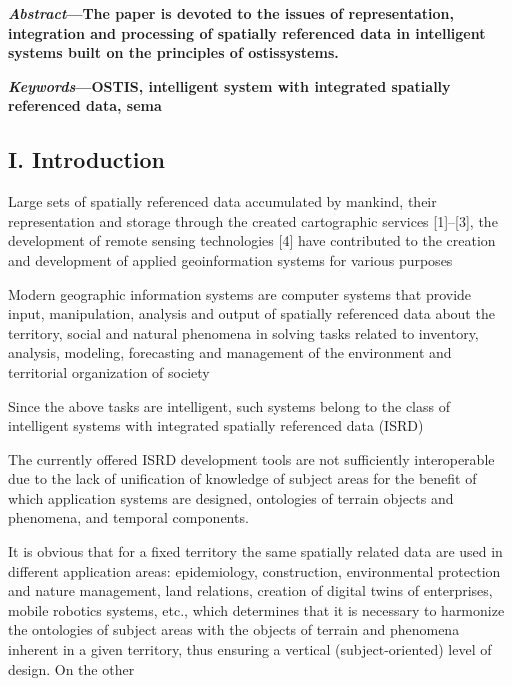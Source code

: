 \documentclass [10pt, letterpaper]{article}
\begin{document}
\begin{multicols}{2}
\textbf{\textit{Abstract}—The paper is devoted to the issues of representation, integration and processing of spatially referenced
data in intelligent systems built on the principles of ostissystems.}\par
\textbf{\textit{Keywords}—OSTIS, intelligent system with integrated spatially referenced data, sema}

    \begin{center}
    \section*{I. Introduction}
\end{center}

\par{Large sets of spatially referenced data accumulated by
mankind, their representation and storage through the
created cartographic services [1]–[3], the development
of remote sensing technologies [4] have contributed to
the creation and development of applied geoinformation
systems for various purposes}\par{Modern geographic information systems are computer
systems that provide input, manipulation, analysis and
output of spatially referenced data about the territory,
social and natural phenomena in solving tasks related to
inventory, analysis, modeling, forecasting and management of the environment and territorial organization of
society}\par{Since the above tasks are intelligent, such systems
belong to the class of intelligent systems with integrated
spatially referenced data (ISRD)}
\par{The currently offered ISRD development tools are not
sufficiently interoperable due to the lack of unification
of knowledge of subject areas for the benefit of which
application systems are designed, ontologies of terrain
objects and phenomena, and temporal components.}
\par{It is obvious that for a fixed territory the same spatially
related data are used in different application areas: epidemiology, construction, environmental protection and
nature management, land relations, creation of digital
twins of enterprises, mobile robotics systems, etc., which
determines that it is necessary to harmonize the ontologies of subject areas with the objects of terrain and
phenomena inherent in a given territory, thus ensuring
a vertical (subject-oriented) level of design. On the other
}
\end{multicols}
\end{document}
